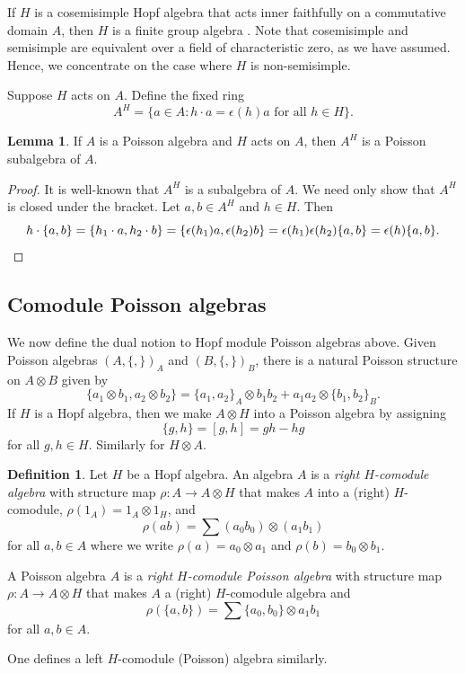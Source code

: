 \documentclass[reqno]{amsart}
\numberwithin{equation}{section}
\theoremstyle{definition}
\newtheorem{definition}[theorem]{Definition}
\newtheorem{lemma}[theorem]{Lemma}
\newcommand\tensor{\otimes}
\begin{document}
If $H$ is a cosemisimple Hopf algebra that acts inner faithfully on a commutative domain $A$, then $H$ is a finite group algebra \cite[Theorem 1.3]{EW0}. Note that cosemisimple and semisimple are equivalent over a field of characteristic zero, as we have assumed. Hence, we concentrate on the case where $H$ is non-semisimple.

Suppose $H$ acts on $A$. Define the fixed ring
\[ A^H = \{ a \in A : h \cdot a = \epsilon(h)a \text{ for all } h \in H\}.\]

\begin{lemma}
\label{lem.fixed}
If $A$ is a Poisson algebra and $H$ acts on $A$, then $A^H$ is a Poisson subalgebra of $A$.
\end{lemma}
\begin{proof}
It is well-known that $A^H$ is a subalgebra of $A$.
We need only show that $A^H$ is closed under the bracket.
Let $a,b \in A^H$ and $h \in H$. Then
\[ h \cdot \{a,b\} = \{ h_1 \cdot a, h_2 \cdot b \}
	= \{ \epsilon(h_1) a, \epsilon(h_2) b\}
	= \epsilon(h_1)\epsilon(h_2) \{a,b\}
	= \epsilon(h) \{a,b\}. \qedhere\]
\end{proof}

\subsection{Comodule Poisson algebras}

We now define the dual notion to Hopf module Poisson algebras above. Given Poisson algebras $(A,\{,\})_A$ and $(B,\{,\})_B$, there is a natural Poisson structure on $A \tensor B$ given by
\[ \{ a_1 \tensor b_1, a_2 \tensor b_2 \} = \{ a_1,a_2\}_A \tensor b_1b_2 + a_1a_2 \tensor \{b_1,b_2\}_B.\]
If $H$ is a Hopf algebra, then we make $A \tensor H$ into a Poisson algebra by assigning 
\[ \{g,h\} = [g,h]=gh-hg \]
for all $g,h \in H$. Similarly for $H \tensor A$.

\begin{definition}
Let $H$ be a Hopf algebra.
An algebra $A$ is a \emph{right $H$-comodule algebra} with structure map $\rho:A \to A \tensor H$ that makes $A$ into a (right) $H$-comodule, $\rho(1_A) = 1_A \tensor 1_H$, and
\[ \rho(ab) = \sum (a_0 b_0) \tensor (a_1 b_1) \]
for all $a,b \in A$ where we write $\rho(a)=a_0 \tensor a_1$ and $\rho(b)=b_0 \tensor b_1$.

A Poisson algebra $A$ is a \emph{right $H$-comodule Poisson algebra} with structure map $\rho:A \to A \tensor H$ that makes $A$ a (right) $H$-comodule algebra and
\[ \rho(\{a,b\}) = \sum \{ a_0, b_0 \} \tensor a_1b_1 \]
for all $a,b \in A$.

One defines a left $H$-comodule (Poisson) algebra similarly.
\end{definition}
\end{document}

